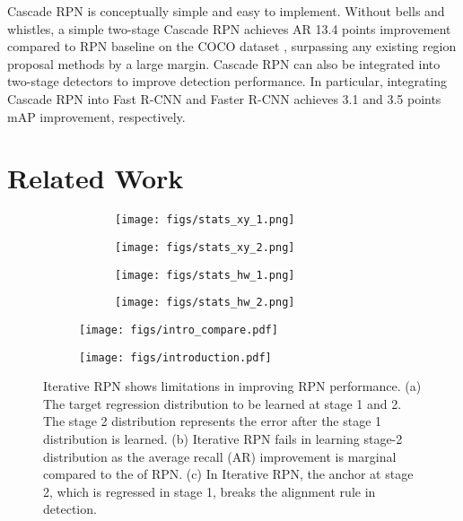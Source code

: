 \documentclass{article}
\begin{document}
	Cascade RPN is conceptually simple and easy to implement. Without bells and whistles, a simple two-stage Cascade RPN achieves AR 13.4 points improvement compared to RPN baseline on the COCO dataset \citep{COCO}, surpassing any existing region proposal methods by a large margin. Cascade RPN can also be integrated into two-stage detectors to improve detection performance. In particular, integrating Cascade RPN into Fast R-CNN and Faster R-CNN achieves 3.1 and 3.5 points mAP improvement, respectively.
	
	\section{Related Work}
	\begin{figure}[t]
		\centering
		\begin{subfigure}{0.34\columnwidth}
			\begin{subfigure}{0.48\columnwidth}
				\centering
				\texttt{[image: figs/stats\_xy\_1.png]}
			\end{subfigure}
			\begin{subfigure}{0.48\columnwidth}
				\centering
				\texttt{[image: figs/stats\_xy\_2.png]}
			\end{subfigure}
			
			\begin{subfigure}{0.48\columnwidth}
				\centering
				\texttt{[image: figs/stats\_hw\_1.png]}
			\end{subfigure}
			\begin{subfigure}{0.48\columnwidth}
				\centering
				\texttt{[image: figs/stats\_hw\_2.png]}
			\end{subfigure}
			\caption{}
			\label{fig:intro_a}
		\end{subfigure}
		\begin{subfigure}{0.17\columnwidth}
			\centering
			\texttt{[image: figs/intro\_compare.pdf]}
			\label{fig:my_label}
			\caption{}
			\label{fig:intro_b}
		\end{subfigure}
		\begin{subfigure}{0.42\columnwidth}
			\centering
			\texttt{[image: figs/introduction.pdf]}
			\label{fig:my_label}
			\caption{}
			\label{fig:intro_c}
		\end{subfigure}
		\caption{Iterative RPN shows limitations in improving RPN performance. (a) The target regression distribution to be learned at stage 1 and 2. The stage 2 distribution represents the error after the stage 1 distribution is learned. (b) Iterative RPN fails in learning stage-2 distribution as the average recall (AR) improvement is marginal compared to the of RPN. (c) In Iterative RPN, the anchor at stage 2, which is regressed in stage 1, breaks the alignment rule in detection.}
		\label{fig:introduction}
	\end{figure}
	
\end{document}
